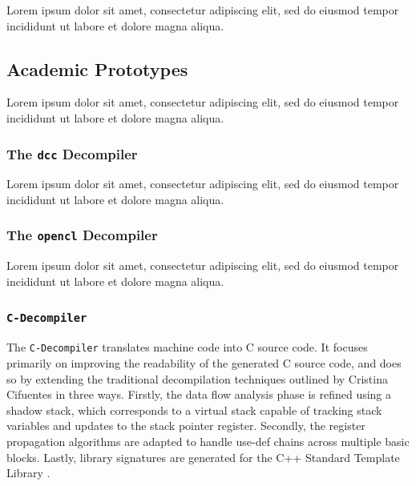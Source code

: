 \documentclass[12pt, a4paper]{article}
\begin{document}
Lorem ipsum dolor sit amet, consectetur adipiscing elit, sed do eiusmod tempor incididunt ut labore et dolore magna aliqua.


\subsection{Academic Prototypes}

Lorem ipsum dolor sit amet, consectetur adipiscing elit, sed do eiusmod tempor incididunt ut labore et dolore magna aliqua.


\subsubsection{The \texttt{dcc} Decompiler}

Lorem ipsum dolor sit amet, consectetur adipiscing elit, sed do eiusmod tempor incididunt ut labore et dolore magna aliqua.

\cite{rev_comp}


\subsubsection{The \texttt{opencl} Decompiler}

Lorem ipsum dolor sit amet, consectetur adipiscing elit, sed do eiusmod tempor incididunt ut labore et dolore magna aliqua.

\cite{decomp_llvm}


\subsubsection{\texttt{C-Decompiler}}

The \texttt{C-Decompiler} translates machine code into C source code. It focuses primarily on improving the readability of the generated C source code, and does so by extending the traditional decompilation techniques outlined by Cristina Cifuentes in three ways. Firstly, the data flow analysis phase is refined using a shadow stack, which corresponds to a virtual stack capable of tracking stack variables and updates to the stack pointer register. Secondly, the register propagation algorithms are adapted to handle use-def chains across multiple basic blocks. Lastly, library signatures are generated for the C++ Standard Template Library \cite{readable_decomp}.
\end{document}
